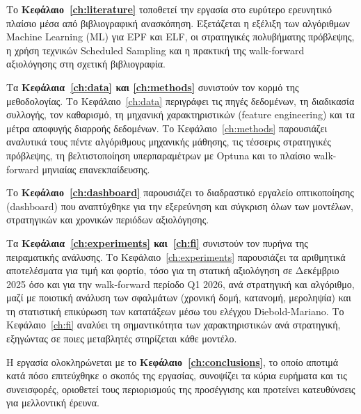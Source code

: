 Το \textbf{Κεφάλαιο~\ref{ch:literature}} τοποθετεί την εργασία στο ευρύτερο ερευνητικό
πλαίσιο μέσα από βιβλιογραφική ανασκόπηση. Εξετάζεται η εξέλιξη των αλγόριθμων
Machine Learning (ML) για EPF και ELF, οι στρατηγικές πολυβήματης πρόβλεψης, η χρήση
τεχνικών Scheduled Sampling και η πρακτική της walk-forward αξιολόγησης στη σχετική
βιβλιογραφία.

Τα \textbf{Κεφάλαια~\ref{ch:data} και \ref{ch:methods}} συνιστούν τον κορμό της
μεθοδολογίας. Το Κεφάλαιο~\ref{ch:data} περιγράφει τις πηγές δεδομένων, τη διαδικασία
συλλογής, τον καθαρισμό, τη μηχανική χαρακτηριστικών (feature engineering) και τα μέτρα
αποφυγής διαρροής δεδομένων. Το Κεφάλαιο~\ref{ch:methods} παρουσιάζει αναλυτικά τους
πέντε αλγόριθμους μηχανικής μάθησης, τις τέσσερις στρατηγικές πρόβλεψης, τη
βελτιστοποίηση υπερπαραμέτρων με Optuna και το πλαίσιο walk-forward μηνιαίας
επανεκπαίδευσης.

Το \textbf{Κεφάλαιο~\ref{ch:dashboard}} παρουσιάζει το διαδραστικό εργαλείο
οπτικοποίησης (dashboard) που αναπτύχθηκε για την εξερεύνηση και σύγκριση όλων των
μοντέλων, στρατηγικών και χρονικών περιόδων αξιολόγησης.

Τα \textbf{Κεφάλαια~\ref{ch:experiments} και~\ref{ch:fi}}
συνιστούν τον πυρήνα της πειραματικής ανάλυσης. Το Κεφάλαιο~\ref{ch:experiments}
παρουσιάζει τα αριθμητικά αποτελέσματα για τιμή και φορτίο, τόσο για τη στατική
αξιολόγηση σε Δεκέμβριο 2025 όσο και για την walk-forward περίοδο Q1 2026, ανά
στρατηγική και αλγόριθμο, μαζί με ποιοτική ανάλυση των σφαλμάτων (χρονική δομή,
κατανομή, μεροληψία) και τη στατιστική επικύρωση των κατατάξεων μέσω του ελέγχου
Diebold-Mariano. Το Κεφάλαιο~\ref{ch:fi}
αναλύει τη σημαντικότητα των χαρακτηριστικών ανά στρατηγική, εξηγώντας σε ποιες
μεταβλητές στηρίζεται κάθε μοντέλο.

Η εργασία ολοκληρώνεται με το \textbf{Κεφάλαιο~\ref{ch:conclusions}}, το οποίο
αποτιμά κατά πόσο επιτεύχθηκε ο σκοπός της εργασίας, συνοψίζει τα κύρια ευρήματα και
τις συνεισφορές, οριοθετεί τους περιορισμούς της προσέγγισης και προτείνει
κατευθύνσεις για μελλοντική έρευνα.


